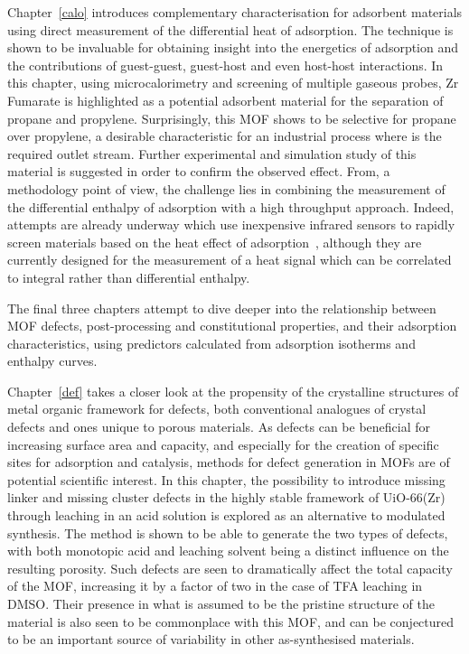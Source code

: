 Chapter~\ref{calo} introduces complementary characterisation 
for adsorbent materials using direct measurement of the
differential heat of adsorption. The technique is shown to be 
invaluable for obtaining insight into the energetics of 
adsorption and the contributions of guest-guest, guest-host 
and even host-host interactions. In this chapter,
using microcalorimetry and screening of multiple gaseous probes,
Zr Fumarate is highlighted as a potential adsorbent material for the 
separation of propane and propylene. Surprisingly, this MOF shows
to be selective for propane over propylene, a desirable characteristic
for an industrial process where  is the required
outlet stream. Further experimental and simulation study of this
material is suggested in order to confirm the observed effect.
From, a methodology point of view, the challenge lies in combining
the measurement of the differential enthalpy of adsorption with a 
high throughput approach. 
Indeed, attempts are already underway which use inexpensive infrared 
sensors to rapidly screen materials based on the heat effect of 
adsorption~\cite{wollmannInfrasorbOpticalDetection2012}, although
they are currently designed for the measurement of a heat signal 
which can be correlated to  integral rather than differential enthalpy.

The final three chapters attempt to dive deeper into the relationship
between MOF defects, post-processing and constitutional properties,
and their adsorption characteristics, using predictors calculated from
adsorption isotherms and enthalpy curves.

Chapter~\ref{def} takes a closer look at the propensity of the 
crystalline structures of metal organic framework for defects,
both conventional analogues of crystal defects and ones unique
to porous materials. As defects can be beneficial for increasing 
surface area and capacity, and especially for the creation
of specific sites for adsorption and catalysis, methods for 
defect generation in MOFs are of potential scientific interest.
In this chapter, the possibility to introduce missing linker and 
missing cluster defects in the highly stable framework of UiO-66(Zr)
through leaching in an acid solution is explored as an alternative 
to modulated synthesis. The method is shown to be able to generate
the two types of defects, with both monotopic acid and leaching 
solvent being a distinct influence on the resulting porosity.
Such defects are seen to dramatically affect the total capacity 
of the MOF, increasing it by a factor of two in the case of TFA
leaching in DMSO. Their presence in what is assumed
to be the pristine structure of the material is also seen 
to be commonplace with this MOF, and can be conjectured to be an
important source of variability in other as-synthesised materials.

